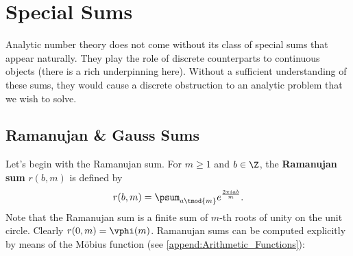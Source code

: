     \section{Special Sums}
      Analytic number theory does not come without its class of special sums that appear naturally. They play the role of discrete counterparts to continuous objects (there is a rich underpinning here). Without a sufficient understanding of these sums, they would cause a discrete obstruction to an analytic problem that we wish to solve.
      \subsection*{Ramanujan \& Gauss Sums}
        Let's begin with the Ramanujan sum. For $m \ge 1$ and $b \in \Z$, the \textbf{Ramanujan sum} $r(b,m)$ is defined by
        \[
          r(b,m) = \psum_{a \tmod{m}}e^{\frac{2\pi iab}{m}}.
        \]
        Note that the Ramanujan sum is a finite sum of $m$-th roots of unity on the unit circle. Clearly $r(0,m) = \vphi(m)$. Ramanujan sums can be computed explicitly by means of the M\"obius function (see \cref{append:Arithmetic_Functions}):

